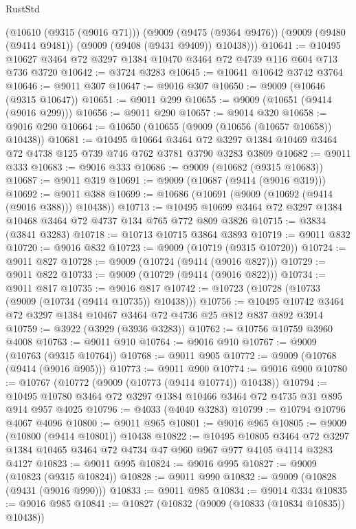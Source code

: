 \begin{lexlean}{RustStd}
\begin{coremodule}
    (@10610 (@9315 (@9016 @71)))
    (@9009 (@9475 (@9364 @9476)) (@9009 (@9480 (@9414 @9481)) (@9009 (@9408 (@9431 @9409)) @10438)))
@10641 := @10495 @10627 @3464 @72 @3297 @1384 @10470 @3464 @72 @4739 @116 @604 @713 @736 @3720
@10642 := @3724 @3283
@10645 := @10641 @10642 @3742 @3764
@10646 := @9011 @307
@10647 := @9016 @307
@10650 := @9009 (@10646 (@9315 @10647))
@10651 := @9011 @299
@10655 := @9009 (@10651 (@9414 (@9016 @299)))
@10656 := @9011 @290
@10657 := @9014 @320
@10658 := @9016 @290
@10664 := @10650 (@10655 (@9009 (@10656 (@10657 @10658)) @10438))
@10681 := @10495
    @10664
    @3464
    @72
    @3297
    @1384
    @10469
    @3464
    @72
    @4738
    @125
    @739
    @746
    @762
    @3781
    @3790
    @3283
    @3809
@10682 := @9011 @333
@10683 := @9016 @333
@10686 := @9009 (@10682 (@9315 @10683))
@10687 := @9011 @319
@10691 := @9009 (@10687 (@9414 (@9016 @319)))
@10692 := @9011 @388
@10699 := @10686 (@10691 (@9009 (@10692 (@9414 (@9016 @388))) @10438))
@10713 := @10495 @10699 @3464 @72 @3297 @1384 @10468 @3464 @72 @4737 @134 @765 @772 @809 @3826
@10715 := @3834 (@3841 @3283)
@10718 := @10713 @10715 @3864 @3893
@10719 := @9011 @832
@10720 := @9016 @832
@10723 := @9009 (@10719 (@9315 @10720))
@10724 := @9011 @827
@10728 := @9009 (@10724 (@9414 (@9016 @827)))
@10729 := @9011 @822
@10733 := @9009 (@10729 (@9414 (@9016 @822)))
@10734 := @9011 @817
@10735 := @9016 @817
@10742 := @10723 (@10728 (@10733 (@9009 (@10734 (@9414 @10735)) @10438)))
@10756 := @10495 @10742 @3464 @72 @3297 @1384 @10467 @3464 @72 @4736 @25 @812 @837 @892 @3914
@10759 := @3922 (@3929 (@3936 @3283))
@10762 := @10756 @10759 @3960 @4008
@10763 := @9011 @910
@10764 := @9016 @910
@10767 := @9009 (@10763 (@9315 @10764))
@10768 := @9011 @905
@10772 := @9009 (@10768 (@9414 (@9016 @905)))
@10773 := @9011 @900
@10774 := @9016 @900
@10780 := @10767 (@10772 (@9009 (@10773 (@9414 @10774)) @10438))
@10794 := @10495 @10780 @3464 @72 @3297 @1384 @10466 @3464 @72 @4735 @31 @895 @914 @957 @4025
@10796 := @4033 (@4040 @3283)
@10799 := @10794 @10796 @4067 @4096
@10800 := @9011 @965
@10801 := @9016 @965
@10805 := @9009 (@10800 (@9414 @10801)) @10438
@10822 := @10495
    @10805
    @3464
    @72
    @3297
    @1384
    @10465
    @3464
    @72
    @4734
    @47
    @960
    @967
    @977
    @4105
    @4114
    @3283
    @4127
@10823 := @9011 @995
@10824 := @9016 @995
@10827 := @9009 (@10823 (@9315 @10824))
@10828 := @9011 @990
@10832 := @9009 (@10828 (@9431 (@9016 @990)))
@10833 := @9011 @985
@10834 := @9014 @334
@10835 := @9016 @985
@10841 := @10827 (@10832 (@9009 (@10833 (@10834 @10835)) @10438))

\end{coremodule}
\end{lexlean}
